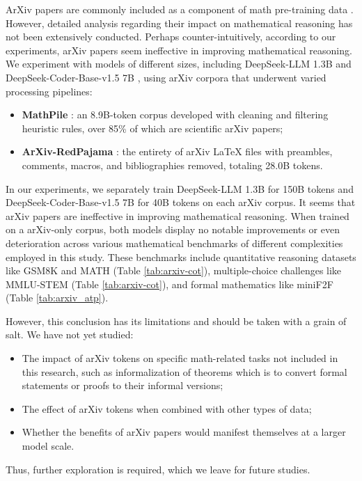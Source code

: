 ArXiv papers are commonly included as a component of math pre-training data \citep{minerva,gpt-f,llemma,mathpile}.
However, detailed analysis regarding their impact on mathematical reasoning has not been extensively conducted.
Perhaps counter-intuitively, according to our experiments, arXiv papers seem ineffective in improving mathematical reasoning.
We experiment with models of different sizes, including DeepSeek-LLM 1.3B and DeepSeek-Coder-Base-v1.5 7B \citep{deepseek-coder}, using arXiv corpora that underwent varied processing pipelines:
\begin{itemize}[topsep=0pt]
    \item \textbf{MathPile} \citep{mathpile}:
    an 8.9B-token corpus developed with cleaning and filtering heuristic rules, over 85\% of which are scientific arXiv papers;
    \item \textbf{ArXiv-RedPajama} \citep{redpajama}:
    the entirety of arXiv LaTeX files with preambles, comments, macros, and bibliographies removed, totaling 28.0B tokens.
\end{itemize}
\noindent
In our experiments, we separately train DeepSeek-LLM 1.3B for 150B tokens and DeepSeek-Coder-Base-v1.5 7B for 40B tokens on each arXiv corpus. It seems that arXiv papers are ineffective in improving mathematical reasoning.
When trained on a arXiv-only corpus, both models display no notable improvements or even deterioration across various mathematical benchmarks of different complexities employed in this study.
These benchmarks include quantitative reasoning datasets like GSM8K and MATH (Table \ref{tab:arxiv-cot}), multiple-choice challenges like MMLU-STEM (Table \ref{tab:arxiv-cot}), and formal mathematics like miniF2F (Table \ref{tab:arxiv_atp}).

However, this conclusion has its limitations and should be taken with a grain of salt.
We have not yet studied:
\begin{itemize}[topsep=0pt]
    \item The impact of arXiv tokens on specific math-related tasks not included in this research, such as informalization of theorems which is to convert formal statements or proofs to their informal versions;
    \item The effect of arXiv tokens when combined with other types of data;
    \item Whether the benefits of arXiv papers would manifest themselves at a larger model scale.
\end{itemize}
Thus, further exploration is required, which we leave for future studies.

